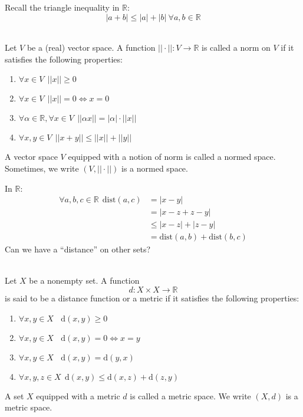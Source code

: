 Recall the triangle inequality in $\mathbb{R}$:
$$|a+b| \leq |a| + |b| ~\forall a,b \in \mathbb{R}$$

\begin{definition}  \leavevmode \\
    Let $V$ be a (real) vector space. A function $|| \cdot ||:V\rightarrow \mathbb{R}$ is called a norm on $V$ if it satisfies the following properties:
    \begin{enumerate}[$(i)$]
        \item $\forall x \in V ~~ ||x|| \geq 0$
        \item $\forall x \in V ~~ ||x|| = 0 \iff x = 0$
        \item $\forall \alpha \in \mathbb{R}, \forall x \in V ~~||\alpha x|| = | \alpha | \cdot ||x||$
        \item $\forall x,y \in V ~~ ||x+y|| \leq ||x|| + ||y||$
    \end{enumerate}
    A vector space $V$ equipped with a notion of norm is called a normed space. Sometimes, we write $(V, || \cdot ||)$ is a normed space.
\end{definition}

In $\mathbb{R}$:
\begin{align*}
    \forall a,b,c \in \mathbb{R} ~~ \text{dist}(a,c) &= |x-y| \\
    &=|x-z+z-y| \\
    &\leq |x-z| + |z-y| \\
    &=  \text{dist}(a,b) + \text{dist}(b,c)
\end{align*}
Can we have a “distance” on other sets?

\begin{definition}  \leavevmode \\
    Let $X$ be a nonempty set. A function
    $$d:X \times X \rightarrow \mathbb{R}$$
    is said to be a distance function or a metric if it satisfies the following properties:
    \begin{enumerate}[$(i)$]
        \item $\forall x,y \in X ~~~~ \text{d}(x,y) \geq 0$
        \item $\forall x,y \in X ~~~~ \text{d}(x,y) = 0 \iff x=y$
        \item $\forall x,y \in X ~~~~ \text{d}(x,y) = \text{d}(y,x)$
        \item $\forall x,y,z \in X ~~ \text{d}(x,y) \leq  \text{d}(x,z) + \text{d}(z,y)$
    \end{enumerate}
    A set $X$ equipped with a metric $d$ is called a metric space. We write $(X, d)$ is a metric space.
\end{definition}

